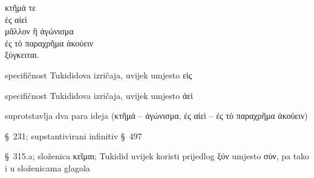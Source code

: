 {\large
\begin{greek}
\noindent κτῆμά τε \\
\tabto{2em} ἐς αἰεὶ \\
μᾶλλον ἢ ἀγώνισμα \\
\tabto{2em} ἐς τὸ παραχρῆμα ἀκούειν \\
ξύγκειται.\\

\end{greek}
}

\begin{description}[noitemsep]
\item[ἐς] specifičnost Tukididova izričaja, uvijek umjesto εἰς
\item[αἰεὶ] specifičnost Tukididova izričaja, uvijek umjesto ἀεί
\item[μᾶλλον ἢ] suprotstavlja dva para ideja \textgreek[variant=ancient]{(κτῆμά – ἀγώνισμα, ἐς αἰεὶ – ἐς τὸ παραχρῆμα ἀκούειν)}
\item[ἀκούειν] §~231; supstantivirani infinitiv §~497
\item[ξύγκειται] §~315.a; složenica κεῖμαι; Tukidid uvijek koristi prijedlog ξύν umjesto σύν, pa tako i u složenicama glagola

\end{description}



